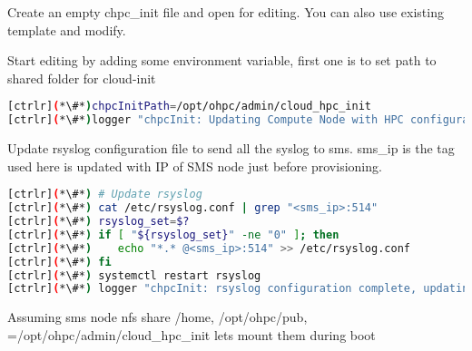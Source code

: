 Create an empty chpc\_init file and open for editing. You can also use  existing template and modify.

Start editing by adding some environment variable, first one is to set path to shared folder for cloud-init


\begin{lstlisting}[language=bash,keywords={}]
[ctrlr](*\#*)chpcInitPath=/opt/ohpc/admin/cloud_hpc_init
[ctrlr](*\#*)logger "chpcInit: Updating Compute Node with HPC configuration"
\end{lstlisting}

Update rsyslog configuration file to send all the syslog to sms. sms\_ip is the tag used here is updated with IP of SMS node just before provisioning.

\begin{lstlisting}[language=bash,keywords={}]
[ctrlr](*\#*) # Update rsyslog
[ctrlr](*\#*) cat /etc/rsyslog.conf | grep "<sms_ip>:514"
[ctrlr](*\#*) rsyslog_set=$?
[ctrlr](*\#*) if [ "${rsyslog_set}" -ne "0" ]; then
[ctrlr](*\#*)    echo "*.* @<sms_ip>:514" >> /etc/rsyslog.conf
[ctrlr](*\#*) fi
[ctrlr](*\#*) systemctl restart rsyslog
[ctrlr](*\#*) logger "chpcInit: rsyslog configuration complete, updating remaining HPC configuration"
\end{lstlisting}

Assuming sms node nfs share /home, /opt/ohpc/pub, =/opt/ohpc/admin/cloud\_hpc\_init lets mount them during boot

